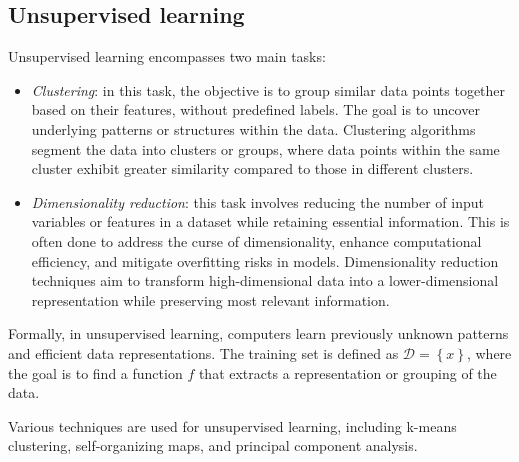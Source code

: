 \subsection{Unsupervised learning}
Unsupervised learning encompasses two main tasks:
\begin{itemize}
    \item \textit{Clustering}: in this task, the objective is to group similar data points together based on their features, without predefined labels. 
        The goal is to uncover underlying patterns or structures within the data. 
        Clustering algorithms segment the data into clusters or groups, where data points within the same cluster exhibit greater similarity compared to those in different clusters. 
    \item \textit{Dimensionality reduction}: this task involves reducing the number of input variables or features in a dataset while retaining essential information. 
        This is often done to address the curse of dimensionality, enhance computational efficiency, and mitigate overfitting risks in models. 
        Dimensionality reduction techniques aim to transform high-dimensional data into a lower-dimensional representation while preserving most relevant information.
\end{itemize}
Formally, in unsupervised learning, computers learn previously unknown patterns and efficient data representations.
The training set is defined as $\mathcal{D}=\left\{ x \right\}$, where the goal is to find a function $f$ that extracts a representation or grouping of the data.

Various techniques are used for unsupervised learning, including k-means clustering, self-organizing maps, and principal component analysis.

